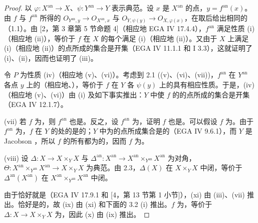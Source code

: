 \begin{proof}
以 $\varphi:X^{\mathrm{an}}\to X$、$\psi:Y^{\mathrm{an}}\to Y$ 表示典范。设 $x$ 是 $X^{\mathrm{an}}$ 的点，$y=f^{\mathrm{an}}(x)$。由 $f$ 与 $f^{\mathrm{an}}$ 所得的 $O_{Y^{\mathrm{an}},y}\to O_{X^{\mathrm{an}},x}$ 与 $O_{Y,\psi(y)}\to O_{X,\varphi(x)}$，在取后给出相同的（1.1）。由 [2，第 3 章第 5 节命题 4]（相应地 EGA IV 17.4.4），$f^{\mathrm{an}}$ 满足性质 (i)（相应地 (ii)），等价于 $f$ 在 $X$ 的每个满足 (i)（相应地 (ii)）。又由于 $X$ 上满足 (i)（相应地 (ii)）的点所成的集合是开集（EGA IV 11.1.1 和 I 3.3），这就证明了 (i)、(ii)，因而也证明了 (iii)。

令 $P$ 为性质 (iv)（相应地 (v)、(vi)）。考虑到 2.1 ((v)、(vi)、(vii))，$f^{\mathrm{an}}$ 在 $Y^{\mathrm{an}}$ 各点 $y$ 上的（相应地、），等价于 $f$ 在 $Y$ 各 $\psi(y)$ 上的具有相应性质。于是，(iv)（相应地 (v)、(vi)）由 (i) 及如下事实推出：$Y$ 中使 $f$ 的的点所成的集合是开集（EGA IV 12.1.7）。

(vii) 若 $f$ 为，则 $f^{\mathrm{an}}$ 也是。反之，设 $f^{\mathrm{an}}$ 为，证明 $f$ 也是。可以假设 $f$ 为。由于 $f^{\mathrm{an}}$ 为，$f$ 在 $Y$ 的处的是的；$Y$ 中为的点所成集合是的（EGA IV 9.6.1），而 $Y$ 是 Jacobson ，所以 $f$ 的所有都为的，因而 $f$ 为。

(viii) 设 $\Delta:X\to X\times_YX$ 与 $\Delta^{\mathrm{an}}:X^{\mathrm{an}}\to X^{\mathrm{an}}\times_{Y^{\mathrm{an}}}X^{\mathrm{an}}$ 为对角，$\Theta:X^{\mathrm{an}}\times_{Y^{\mathrm{an}}}X^{\mathrm{an}}\to X\times_YX$ 为典范。由 2.3，$\Delta(X)$ 在 $X\times_YX$ 中闭，等价于 $\Delta^{\mathrm{an}}(X^{\mathrm{an}})$ 在 $X^{\mathrm{an}}\times_{Y^{\mathrm{an}}}X^{\mathrm{an}}$ 中闭。

由于恰好就是（EGA IV 17.9.1 和 [4，第 13 节第 1 小节]），(xi) 由 (iii)、(vii) 推出。恰好是的，故 (ix) 由 (xi) 和下面的 3.2 (i) 推出。$f$ 为，等价于 $\Delta:X\to X\times_YX$ 为，因此 (x) 由 (ix) 推出。
\end{proof}

